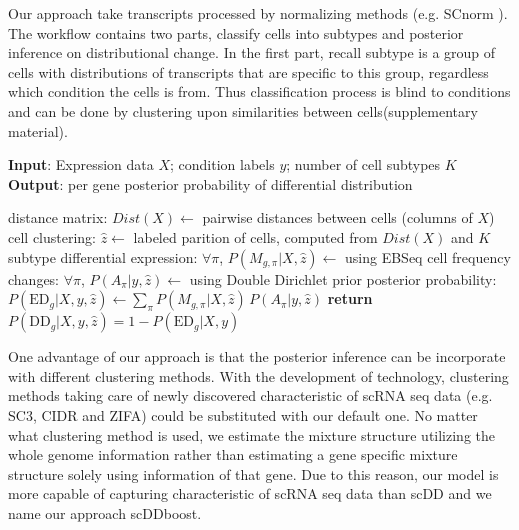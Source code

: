 \documentclass[11pt]{amsart}
\begin{document}
Our approach take transcripts processed by normalizing methods (e.g. SCnorm \cite{ref:Rhonda}). 
The workflow contains two parts, classify cells into subtypes and posterior inference on distributional change. In the first part, recall subtype is a group of cells with distributions of transcripts that are specific to this group, regardless which condition the cells is from. Thus classification process is blind to conditions and can be done by clustering upon similarities between cells(supplementary material). 
\begin{algorithm}
\caption{}\label{alg:scDDboost}
\raggedright\hspace*{\algorithmicindent} \textbf{Input}: Expression data $X$; condition labels $y$; number of cell subtypes $K$ \\
\hspace*{\algorithmicindent} \textbf{Output}: per gene posterior probability of differential distribution
\begin{algorithmic}[1]
\State distance matrix: $Dist(X) \gets$ pairwise distances between cells (columns of $X$)
\State cell clustering: $\hat z \gets$ labeled parition of cells, computed from $Dist(X)$ and $K$
\State subtype differential expression: $\forall \pi$,  $P(M_{g,\pi} | X, \hat z)\gets$ using EBSeq\cite{ref:Leng}
\State cell frequency changes: $\forall \pi$, $P(A_\pi | y, \hat z)\gets$ using Double Dirichlet prior
\State posterior probability: $P(\text{ED}_g | X, y, \hat z)\gets \underset{\pi}{\sum}P(M_{g,\pi} | X, \hat z) \,
 P(A_\pi | y, \hat z)$
\State \textbf{return} $P(\text{DD}_g |X, y, \hat z)=1-P(\text{ED}_g| X,y)$
\EndProcedure
\end{algorithmic}
\end{algorithm}

One advantage of our approach is that the posterior inference can be incorporate with different clustering methods. With the development of technology, clustering methods taking care of newly discovered characteristic of scRNA seq data (e.g. SC3\cite{sc3}, CIDR\cite{CIDR} and ZIFA\cite{ZIFA}) could be substituted with our default one. No matter what clustering method is used, we estimate the mixture structure utilizing the whole genome information rather than estimating a gene specific mixture structure solely using information of that gene. Due to this reason, our model is more capable of capturing characteristic of scRNA seq data than scDD and we name our approach scDDboost. 
\end{document}
